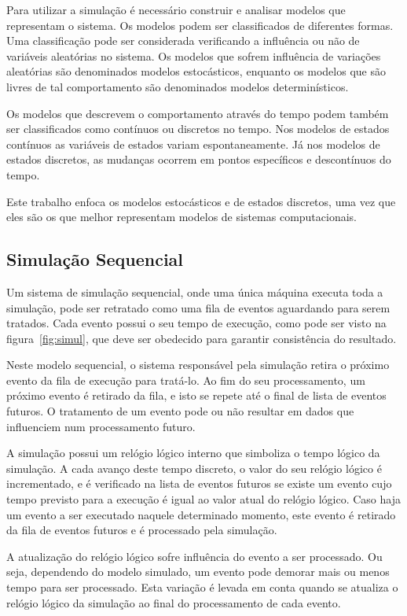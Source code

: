 Para utilizar a simulação é necessário construir e analisar modelos que representam o sistema. Os modelos podem ser classificados de diferentes formas. Uma classificação pode ser considerada verificando a influência ou não de variáveis aleatórias no sistema. Os modelos que sofrem influência de variações aleatórias são denominados modelos estocásticos, enquanto os modelos que são livres de tal comportamento são denominados modelos determinísticos.

Os modelos que descrevem o comportamento através do tempo podem também ser classificados como contínuos ou discretos no tempo. Nos modelos de estados contínuos as variáveis de estados variam espontaneamente. Já nos modelos de estados discretos, as mudanças ocorrem em pontos específicos e descontínuos do tempo.

Este trabalho enfoca os modelos estocásticos e de estados discretos, uma vez que eles são os que melhor representam modelos de sistemas computacionais.

\subsection{Simulação Sequencial}

Um sistema de simulação sequencial, onde uma única máquina executa toda a simulação, pode ser retratado como uma fila de eventos aguardando para serem tratados. Cada evento possui o seu tempo de execução, como pode ser visto na figura~\ref{fig:simul}, que deve ser obedecido para garantir consistência do resultado.

Neste modelo sequencial, o sistema responsável pela simulação retira o próximo evento da fila de execução para tratá-lo. Ao fim do seu processamento, um próximo evento é retirado da fila, e isto se repete até o final de lista de eventos futuros. O tratamento de um evento pode ou não resultar em dados que influenciem num processamento futuro.

A simulação possui um relógio lógico interno que simboliza o tempo lógico da simulação. A cada avanço deste tempo discreto, o valor do seu relógio lógico é incrementado, e é verificado na lista de eventos futuros se existe um evento cujo tempo previsto para a execução é igual ao valor atual do relógio lógico. Caso haja um evento a ser executado naquele determinado momento, este evento é retirado da fila de eventos futuros e é processado pela simulação.

A atualização do relógio lógico sofre influência do evento a ser processado. Ou seja, dependendo do modelo simulado, um evento pode demorar mais ou menos tempo para ser processado. Esta variação é levada em conta quando se atualiza o relógio lógico da simulação ao final do processamento de cada evento.

